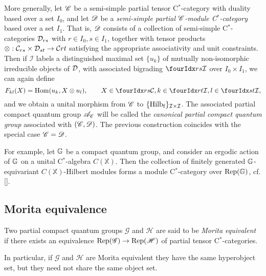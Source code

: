\begin{Exa} More generally, let $\mathscr{C}$ be a semi-simple partial tensor C$^*$-category with duality based over a set $I_0$, and let $\mathscr{D}$ be a \emph{semi-simple partial $\mathscr{C}$-module C$^*$-category} based over a set $I_1$. That is, $\mathscr{D}$ consists of a collection of semi-simple C$^*$-categories $\mathcal{D}_{rs}$ with $r\in I_0,s\in I_1$, together with tensor products $\otimes: \mathcal{C}_{rs}\times \mathcal{D}_{st}\rightarrow \mathcal{C}{rt}$ satisfying the appropriate associativity and unit constraints. Then if $\mathcal{I}$ labels a distinguished maximal set $\{u_k\}$ of mutually non-isomorphic irreducible objects of $\mathcal{D}$, with associated bigrading $\Gru{\mathcal{I}}{r}{s}$ over $I_0\times I_1$, we can again define \[F_{kl}(X)  = \Hom(u_k,  X\otimes u_l),\qquad X\in \Gru{\CatC}{r}{s}, k\in \Gru{\mathcal{I}}{r}{t},l\in \Gru{\mathcal{I}}{s}{t},\] and we obtain a unital morphism from $\mathscr{C}$ to $\{\mathrm{Hilb}_{\operatorname{\mathrm{f}}}\}_{\mathcal{I}\times \mathcal{I}}$. The associated partial compact quantum group $\mathscr{A}_{\mathscr{C}}$ will be called the \emph{canonical partial compact quantum group} associated with $(\mathscr{C},\mathscr{D})$. The previous construction coincides with the special case $\mathscr{C}= \mathscr{D}$.
\end{Exa}

For example, let $\mathbb{G}$ be a compact quantum group, and consider an ergodic action of $\mathbb{G}$ on a unital C$^*$-algebra $C(\mathbb{X})$. Then the collection of finitely generated $\mathbb{G}$-equivariant $C(\mathbb{X})$-Hilbert modules forms a module C$^*$-category over $\mathrm{Rep}(\mathbb{G})$, cf. []. 

\subsection{Morita equivalence}


\begin{Def} Two partial compact quantum groups $\mathscr{G}$ and $\mathscr{H}$ are said to be \emph{Morita equivalent} if there exists an equivalence $\mathrm{Rep}(\mathscr{G}) \rightarrow \mathrm{Rep}(\mathscr{H})$ of partial tensor C$^*$-categories. %
\end{Def} 

In particular, if $\mathscr{G}$ and $\mathscr{H}$ are Morita equivalent they have the same hyperobject set, but they need not share the same object set.

